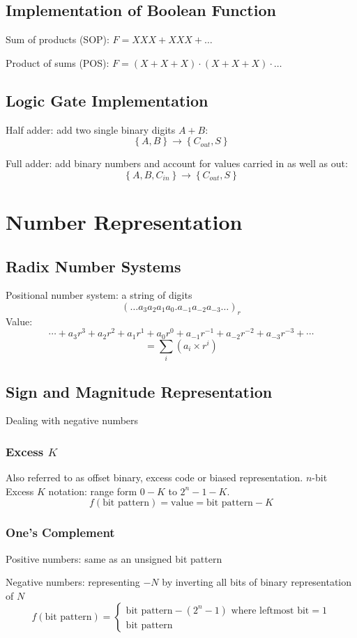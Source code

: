 \documentclass[11pt,a4paper]{article}
\begin{document}
\subsection{Implementation of Boolean Function}
Sum of products (SOP): $F = XXX + XXX + \dots$ \par
Product of sums (POS): $F = (X + X + X) \cdot (X + X + X)  \cdot \dots$

\subsection{Logic Gate Implementation}
Half adder: add two single binary digits $A + B$:
\[
\left\{A, B\right\} \rightarrow \left\{C_{out}, S\right\}
\]

Full adder: add binary numbers and account for values carried in as well as out:
\[
\left\{A, B, C_{in}\right\} \rightarrow \left\{C_{out}, S\right\}
\]

\section{Number Representation}
\subsection{Radix Number Systems}
Positional number system: a string of digits
\[
(\dots a_3 a_2 a_1 a_0.a_{-1} a_{-2} a_{-3} \dots)_r
\]
Value:
\[
\cdots + a_3r^3 + a_2r^2 + a_1r^1 + a_0r^0 + a_{-1}r^{-1} + a_{-2}r^{-2} + a_{-3}r^{-3} + \cdots
\]
\[
= \sum_i (a_i \times r^i)
\]

\subsection{Sign and Magnitude Representation}
Dealing with negative numbers

\subsubsection{Excess $K$}
Also referred to as offset binary, excess code or biased representation.
$n$-bit Excess $K$ notation: range form $0-K$ to $2^n-1-K$.
\[
f(\text{bit pattern}) = \text{value} = \text{bit pattern} - K
\]

\subsubsection{One's Complement}
Positive numbers: same as an unsigned bit pattern \par
Negative numbers: representing $-N$ by inverting all bits of binary representation of $N$
\[
f(\text{bit pattern}) =
\begin{cases}
    \text{bit pattern} - (2^n - 1) \text{  where leftmost bit} = 1 \\
    \text{bit pattern}
\end{cases}
\]
\end{document}
